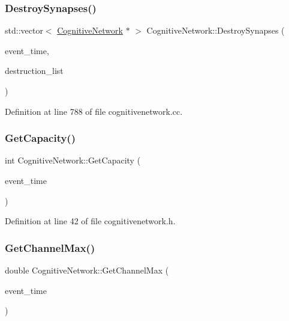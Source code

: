 \subsubsection{\texorpdfstring{Destroy\+Synapses()}{DestroySynapses()}}
{\footnotesize\ttfamily std\+::vector$<$ \mbox{\hyperlink{class_cognitive_network}{Cognitive\+Network}} $\ast$ $>$ Cognitive\+Network\+::\+Destroy\+Synapses (\begin{DoxyParamCaption}\item[{std\+::chrono\+::time\+\_\+point$<$ \mbox{\hyperlink{universe_8h_a0ef8d951d1ca5ab3cfaf7ab4c7a6fd80}{Clock}} $>$}]{event\+\_\+time,  }\item[{std\+::vector$<$ \mbox{\hyperlink{class_cognitive_network}{Cognitive\+Network}} $\ast$$>$}]{destruction\+\_\+list }\end{DoxyParamCaption})}



Definition at line 788 of file cognitivenetwork.\+cc.

\mbox{\label{class_cognitive_network_a6bb3fc06029c260dd658d0db072625a7}} 
\subsubsection{\texorpdfstring{Get\+Capacity()}{GetCapacity()}}
{\footnotesize\ttfamily int Cognitive\+Network\+::\+Get\+Capacity (\begin{DoxyParamCaption}\item[{std\+::chrono\+::time\+\_\+point$<$ \mbox{\hyperlink{universe_8h_a0ef8d951d1ca5ab3cfaf7ab4c7a6fd80}{Clock}} $>$}]{event\+\_\+time }\end{DoxyParamCaption})\hspace{0.3cm}{\ttfamily [inline]}}



Definition at line 42 of file cognitivenetwork.\+h.

\mbox{\label{class_cognitive_network_ab67da8690b83618d88f88411121d7071}} 
\subsubsection{\texorpdfstring{Get\+Channel\+Max()}{GetChannelMax()}}
{\footnotesize\ttfamily double Cognitive\+Network\+::\+Get\+Channel\+Max (\begin{DoxyParamCaption}\item[{std\+::chrono\+::time\+\_\+point$<$ \mbox{\hyperlink{universe_8h_a0ef8d951d1ca5ab3cfaf7ab4c7a6fd80}{Clock}} $>$}]{event\+\_\+time }\end{DoxyParamCaption})\hspace{0.3cm}{\ttfamily [inline]}}



